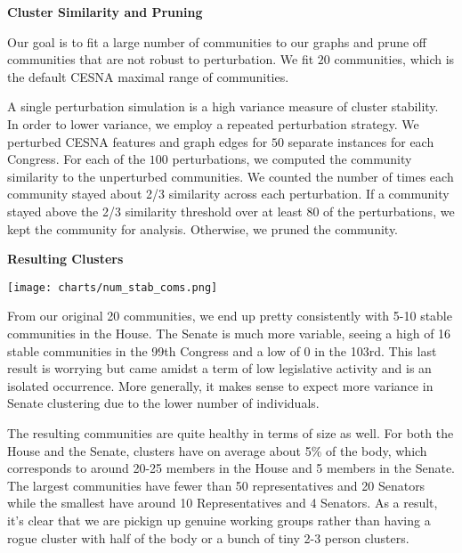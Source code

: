 \textbf{Cluster Similarity and Pruning}

Our goal is to fit a large number of communities to our graphs and prune off
communities that are not robust to perturbation. We fit $20$ communities, which
is the default CESNA maximal range of communities.

A single perturbation simulation is a high variance measure of cluster
stability.~\cite{Tzerpos} In order to lower variance, we employ a repeated
perturbation strategy. We perturbed CESNA features and graph edges for $50$
separate instances for each Congress. For each of the $100$ perturbations, we
computed the community similarity to the unperturbed communities. We counted the
number of times each community stayed about 2/3 similarity across each
perturbation. If a community stayed above the 2/3 similarity threshold over at
least 80 of the perturbations, we kept the community for analysis. Otherwise, we
pruned the community.

\textbf{Resulting Clusters}

\texttt{[image: charts/num\_stab\_coms.png]}

From our original 20 communities, we end up pretty consistently with 5-10 stable communities in the House. The Senate is much more variable, seeing a high of 16 stable communities in the 99th Congress and a low of 0 in the 103rd. This last result is worrying but came amidst a term of low legislative activity and is an isolated occurrence. More generally, it makes sense to expect more variance in Senate clustering due to the lower number of individuals.

The resulting communities are quite healthy in terms of size as well. For both the House and the Senate, clusters have on average about 5\% of the body, which corresponds to around 20-25 members in the House and 5 members in the Senate. The largest communities have fewer than 50 representatives and 20 Senators while the smallest have around 10 Representatives and 4 Senators. As a result, it's clear that we are pickign up genuine working groups rather than having a rogue cluster with half of the body or a bunch of tiny 2-3 person clusters.
